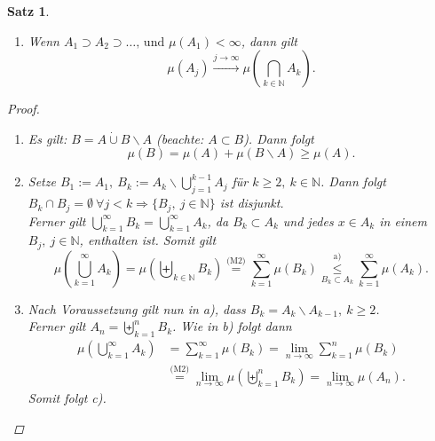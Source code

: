 \documentclass[a4paper]{report}
\newcommand{\N}{\mathbb{N}}
\newcommand{\toInf}{\rightarrow \infty}
\newcommand{\limToInf}[1]{\lim_{#1 \toInf}}
\newcommand{\dcup}{\dot{\cup}}
\newcommand{\bigdcup}{\biguplus}
\theoremstyle{plain}
\newtheorem{satz}[thm]{Satz}
\theoremstyle{definition}
\begin{document}
{{\begin{satz}
\begin{enumerate}
        \item Wenn $A_1 \supset A_2 \supset \dots \text{, und } \mu(A_1) < \infty$, dann gilt
        \begin{displaymath}
             \mu(A_j) \xrightarrow{j\rightarrow \infty} \mu \left(\bigcap_{k \in\N} A_k \right).
        \end{displaymath}
    \end{enumerate}
    \begin{proof}
        \begin{enumerate}
            \item 
                Es gilt: $B= A\dcup B\backslash A$ (beachte: $A\subset B$). Dann folgt 
                \begin{displaymath}
                    \mu(B) = \mu(A) + \mu(B\backslash A) \geq \mu(A).
                \end{displaymath}
            \item
                Setze $B_1 := A_1, \ B_k := A_k \backslash \bigcup_{j=1}^{k-1} A_j$ für $k \geq 2, \ k \in \N$. Dann folgt $B_k \cap B_j = \emptyset \ \forall j < k \Rightarrow \{B_j,\ j\in\N\}$ ist disjunkt.\\
                Ferner gilt $\bigcup_{k=1}^\infty B_k = \bigcup_{k=1}^\infty A_k$, da $B_k \subset A_k$ und jedes $x \in A_k$ in einem $B_j, \ j\in\N$, enthalten ist. Somit gilt
                \begin{displaymath}
                    \mu(\bigcup_{k=1}^\infty A_k) = \mu(\bigdcup_{k\in\N} B_k) \overset{\text{(M2)}}{=} \sum_{k=1}^\infty \mu(B_k) \overset{\text{a)}}{\underset{B_k \subset A_k}{\le}} \sum_{k=1}^\infty \mu(A_k).
                \end{displaymath}
            \item
                Nach Voraussetzung gilt nun in a), dass $B_k = A_k \backslash A_{k-1}, \ k \ge 2$.\\
                Ferner gilt $A_n = \bigdcup_{k=1}^n B_k$. Wie in b) folgt dann
                \begin{displaymath}
                    \begin{split}
                        \mu(\bigcup_{k=1}^\infty A_k) &= \sum_{k=1}^\infty \mu(B_k) = \limToInf{n} \sum_{k=1}^n \mu(B_k)\\
                        &\overset{\text{(M2)}}{=} \limToInf{n} \mu(\bigdcup_{k=1}^n B_k) = \limToInf{n} \mu(A_n).
                    \end{split}
                \end{displaymath}
                Somit folgt c).
        \end{enumerate}
    \end{proof}
\end{satz}
}}
\end{document}
